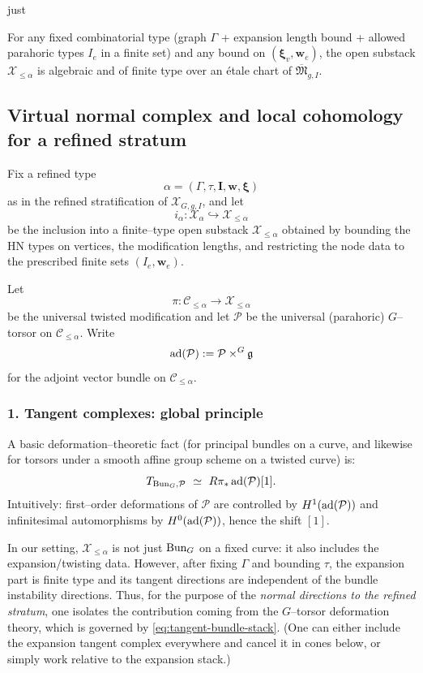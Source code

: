 just \documentclass[12pt]{article}
\begin{document}
\begin{lemma}
\label{lem:finite-type-open}
For any fixed combinatorial type (graph $\Gamma$ + expansion length bound + allowed parahoric types $I_e$ in a finite set) and any bound on $(\boldsymbol{\xi}_v, \mathbf{w}_e)$, the open substack $\mathcal{X}_{\le \alpha}$ is algebraic and of finite type over an étale chart of $\overline{\mathfrak{M}}_{g,I}$.
\end{lemma}
\subsection{Virtual normal complex and local cohomology for a refined stratum}

Fix a refined type
\[
\alpha=(\Gamma,\tau,\mathbf I,\mathbf w,\boldsymbol\xi)
\]
as in the refined stratification of $\mathcal X_{G,g,I}$, and let
\[
i_\alpha:\mathcal X_\alpha \hookrightarrow \mathcal X_{\le \alpha}
\]
be the inclusion into a finite--type open substack $\mathcal X_{\le \alpha}$
obtained by bounding the HN types on vertices, the modification lengths, and
restricting the node data to the prescribed finite sets
$(I_e,\mathbf w_e)$.

Let
\[
\pi:\mathcal C_{\le \alpha}\longrightarrow \mathcal X_{\le \alpha}
\]
be the universal twisted modification and let $\mathcal P$ be the universal
(parahoric) $G$--torsor on $\mathcal C_{\le \alpha}$.
Write
\[
\operatorname{ad}(\mathcal P):=\mathcal P\times^G \mathfrak{g}
\]
for the adjoint vector bundle on $\mathcal C_{\le \alpha}$.

\subsubsection*{1. Tangent complexes: global principle}

A basic deformation--theoretic fact (for principal bundles on a curve, and
likewise for torsors under a smooth affine group scheme on a twisted curve) is:
\begin{equation}
\label{eq:tangent-bundle-stack}
T_{\operatorname{Bun}_G,\mathcal P}\ \simeq\ R\pi_*\operatorname{ad}(\mathcal P)[1].
\end{equation}
Intuitively: first--order deformations of $\mathcal P$ are controlled by
$H^1(\operatorname{ad}(\mathcal P))$ and infinitesimal automorphisms by $H^0(\operatorname{ad}(\mathcal P))$,
hence the shift $[1]$.

In our setting, $\mathcal X_{\le \alpha}$ is not just $\operatorname{Bun}_G$ on a fixed curve:
it also includes the expansion/twisting data.  However, after fixing
$\Gamma$ and bounding $\tau$, the expansion part is finite type and its
tangent directions are independent of the bundle instability directions.
Thus, for the purpose of the \emph{normal directions to the refined stratum},
one isolates the contribution coming from the $G$--torsor deformation theory,
which is governed by \eqref{eq:tangent-bundle-stack}.
(One can either include the expansion tangent complex everywhere and cancel it
in cones below, or simply work relative to the expansion stack.)
\end{document}
